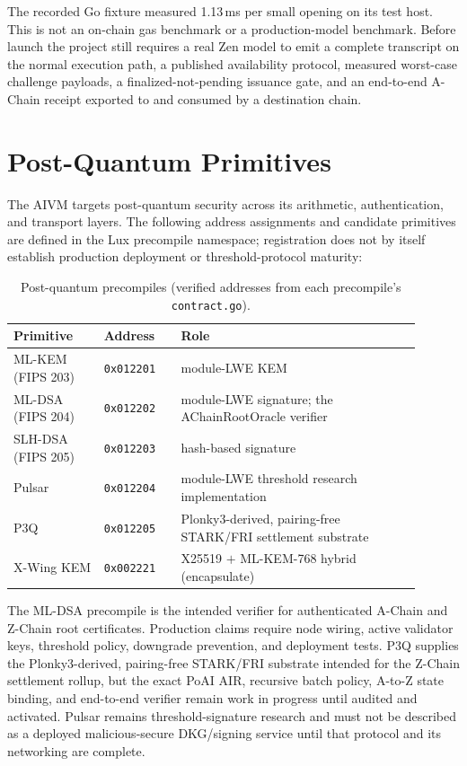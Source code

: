 \documentclass[11pt,a4paper]{article}
\begin{document}
The recorded Go fixture measured 1.13\,ms per small opening on its test host. This is not an on-chain gas benchmark or a production-model benchmark. Before launch the project still requires a real Zen model to emit a complete transcript on the normal execution path, a published availability protocol, measured worst-case challenge payloads, a finalized-not-pending issuance gate, and an end-to-end A-Chain receipt exported to and consumed by a destination chain.

\section{Post-Quantum Primitives}\label{sec:pq}

The AIVM targets post-quantum security across its arithmetic, authentication, and transport layers. The following address assignments and candidate primitives are defined in the Lux precompile namespace; registration does not by itself establish production deployment or threshold-protocol maturity:

\begin{table}[h]
\centering
\small
\begin{tabular}{p{0.20\linewidth}p{0.17\linewidth}p{0.53\linewidth}}
\toprule
\textbf{Primitive} & \textbf{Address} & \textbf{Role} \\
\midrule
ML-KEM (FIPS 203) & \texttt{0x012201} & module-LWE KEM \\
ML-DSA (FIPS 204) & \texttt{0x012202} & module-LWE signature; the AChainRootOracle verifier \\
SLH-DSA (FIPS 205) & \texttt{0x012203} & hash-based signature \\
Pulsar & \texttt{0x012204} & module-LWE threshold research implementation \\
P3Q & \texttt{0x012205} & Plonky3-derived, pairing-free STARK/FRI settlement substrate \\
X-Wing KEM & \texttt{0x002221} & X25519 $+$ ML-KEM-768 hybrid (encapsulate) \\
\bottomrule
\end{tabular}
\caption{Post-quantum precompiles (verified addresses from each precompile's \texttt{contract.go}).}
\end{table}

The ML-DSA precompile is the intended verifier for authenticated A-Chain and Z-Chain root certificates. Production claims require node wiring, active validator keys, threshold policy, downgrade prevention, and deployment tests. P3Q supplies the Plonky3-derived, pairing-free STARK/FRI substrate intended for the Z-Chain settlement rollup, but the exact PoAI AIR, recursive batch policy, A-to-Z state binding, and end-to-end verifier remain work in progress until audited and activated. Pulsar remains threshold-signature research and must not be described as a deployed malicious-secure DKG/signing service until that protocol and its networking are complete.
\end{document}
